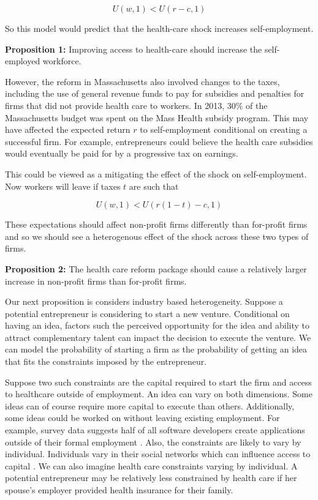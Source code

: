 \documentclass[12pt]{article}
\begin{document}
$$U(w,1) < U(r-c,1)$$

So this model would predict that the health-care shock increases self-employment. 

\textbf{Proposition 1:} 
Improving access to health-care should increase the self-employed workforce. 

However, the reform in Massachusetts also involved changes to the taxes, including the use of general revenue funds to pay for subsidies and penalties for firms that did not provide health care to workers. In 2013, 30\% of the Massachusetts budget was spent on the Mass Health \cite{masshealth} subsidy program. This may have affected the expected  return $r$ to self-employment conditional on creating a successful firm. For example, entrepreneurs could believe the health care subsidies would eventually be paid for by a progressive tax on earnings.

This could be viewed as a mitigating the effect of the shock on self-employment. Now workers will leave if taxes $t$ are such that

$$U(w,1) < U(r(1-t)-c,1)$$

These expectations should affect non-profit firms differently than for-profit firms and so we should see a heterogenous effect of the shock across these two types of firms. 

\textbf{Proposition 2:} 
The health care reform package should cause a relatively larger increase in non-profit firms than for-profit firms. 

Our next proposition is considers industry based heterogeneity. Suppose a potential entrepreneur is considering to start a new venture. Conditional on having an idea, factors such the perceived opportunity for the idea \cite{sorensenSorensen} and ability to attract complementary talent \cite{stuartSorensen} can impact the decision to execute the venture. We can model the probability of starting a firm as the probability of getting an idea that fits the constraints imposed by the entrepreneur. 

Suppose two such constraints are the capital required to start the firm and access to healthcare  outside of employment. An idea can vary on both dimensions. Some ideas can of course require more capital to execute than others. Additionally, some ideas could be worked on without leaving existing employment. For example, survey data suggests half of all software developers create applications outside of their formal employment \cite{evans}. Also, the constraints are likely to vary by individual. Individuals vary in their social networks which can influence access to capital \cite{uzzi}. We can also imagine health care constraints varying by individual. A potential entrepreneur may be relatively less constrained by health care if her spouse's employer provided health insurance for their family. 
\end{document}
